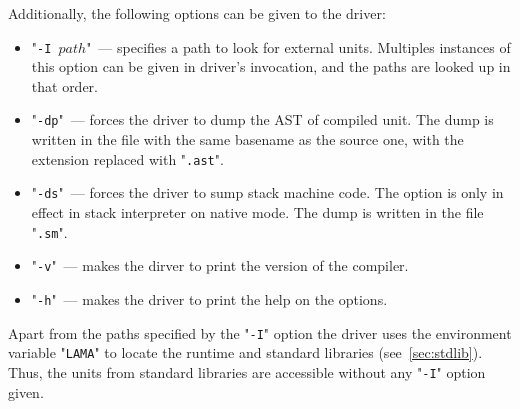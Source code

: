Additionally, the following options can be given to the driver:

\begin{itemize}
\item "\texttt{-I $path$}"~--- specifies a path to look for external units. Multiples instances of this option can be given in driver's
  invocation, and the paths are looked up in that order.
\item "\texttt{-dp}"~--- forces the driver to dump the AST of compiled unit. The dump is written in the file with the same
  basename as the source one, with the extension replaced with "\texttt{.ast}".
\item "\texttt{-ds}"~--- forces the driver to sump stack machine code. The option is only in effect in stack interpreter on
  native mode. The dump is written in the file "\texttt{.sm}".
\item "\texttt{-v}"~--- makes the dirver to print the version of the compiler.
\item "\texttt{-h}"~--- makes the driver to print the help on the options.
\end{itemize}

Apart from the paths specified by the "\texttt{-I}" option the driver uses the environment variable "\texttt{LAMA}"
to locate the runtime and standard libraries (see~\ref{sec:stdlib}). Thus, the units from standard libraries are accessible
without any "\texttt{-I}" option given.
